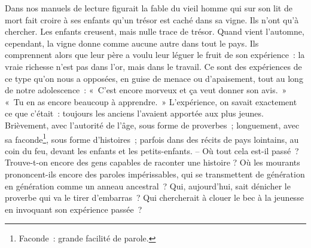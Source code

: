 
{Dans nos manuels de lecture figurait la fable du vieil homme qui sur
son lit de mort fait croire à ses enfants qu'un trésor est caché dans
sa vigne. Ils n'ont qu'à chercher. Les enfants creusent, mais nulle
trace de trésor. Quand vient l'automne, cependant, la vigne donne
comme aucune autre dans tout le pays. Ils comprennent alors que leur
père a voulu leur léguer le fruit de son expérience~: la vraie
richesse n'est pas dans l'or, mais dans le travail. Ce sont des
expériences de ce type qu'on nous a opposées, en guise de menace ou
d'apaisement, tout au long de notre adolescence~: «~C'est encore
morveux et ça veut donner son avis.~» «~Tu en as encore beaucoup à
apprendre.~» L'expérience, on savait exactement ce que c'était~:
toujours les anciens l'avaient apportée aux plus jeunes. Brièvement,
avec l'autorité de l'âge, sous forme de proverbes~; longuement, avec
sa faconde\footnote{Faconde~: grande facilité de parole.}, sous forme
d'histoires~; parfois dans des récits de pays lointains, au coin du
feu, devant les enfants et les petits-enfants. – Où tout cela est-il
passé~? Trouve-t-on encore des gens capables de raconter une histoire
? Où les mourants prononcent-ils encore des paroles impérissables,
qui se transmettent de génération en génération comme un anneau
ancestral~? Qui, aujourd'hui, sait dénicher le proverbe qui va le
tirer d'embarras~? Qui chercherait à clouer le bec à la jeunesse en
invoquant son expérience passée~?

}
